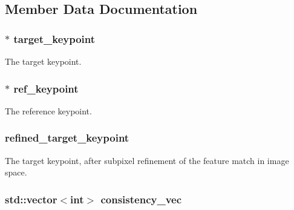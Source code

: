 \subsection{Member Data Documentation}
\hypertarget{classfovis_1_1FeatureMatch_a85a2bf617b8f5152083f5acda254a61c}{
\subsubsection[{target\_\-keypoint}]{$\ast$ {\bf target\_\-keypoint}}}
\label{classfovis_1_1FeatureMatch_a85a2bf617b8f5152083f5acda254a61c}
The target keypoint. \hypertarget{classfovis_1_1FeatureMatch_a63211a4e001cec95acf8363b81af1216}{
\subsubsection[{ref\_\-keypoint}]{$\ast$ {\bf ref\_\-keypoint}}}
\label{classfovis_1_1FeatureMatch_a63211a4e001cec95acf8363b81af1216}
The reference keypoint. \hypertarget{classfovis_1_1FeatureMatch_ac7bde8fda75951ab16ca9ed8adfe2118}{
\subsubsection[{refined\_\-target\_\-keypoint}]{ {\bf refined\_\-target\_\-keypoint}}}
\label{classfovis_1_1FeatureMatch_ac7bde8fda75951ab16ca9ed8adfe2118}
The target keypoint, after subpixel refinement of the feature match in image space. \hypertarget{classfovis_1_1FeatureMatch_a92a84284bf0e8709364e0250c1063257}{
\subsubsection[{consistency\_\-vec}]{\setlength{\rightskip}{0pt plus 5cm}std::vector$<$int$>$ {\bf consistency\_\-vec}}}
